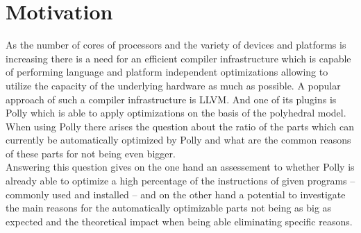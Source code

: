 \chapter{Motivation}
As the number of cores of processors and the variety of devices and platforms is increasing there is a need for an efficient compiler infrastructure which is capable of performing language and platform independent optimizations allowing to utilize the capacity of the underlying hardware as much as possible.
A popular approach of such a compiler infrastructure is LLVM.
And one of its plugins is Polly which is able to apply optimizations on the basis of the polyhedral model.
When using Polly there arises the question about the ratio of the parts which can currently be automatically optimized by Polly and what are the common reasons of these parts for not being even bigger.\\
Answering this question gives on the one hand an assessement to whether Polly is already able to optimize a high percentage of the instructions of given programs -- commonly used and installed -- and on the other hand a potential to investigate the main reasons for the automatically optimizable parts not being as big as expected and the theoretical impact when being able eliminating specific reasons.

